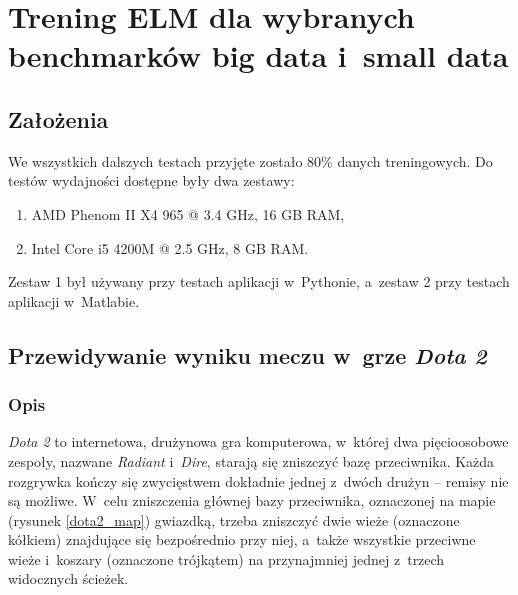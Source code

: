 \documentclass[pl]{minipw} %
\begin{document}
\chapter{Trening ELM dla wybranych benchmarków big data i~small data}
\section{Założenia}
We wszystkich dalszych testach przyjęte zostało 80\% danych treningowych. Do testów wydajności dostępne były dwa zestawy:
\begin{enumerate}
\item AMD Phenom II X4 965 @ 3.4 GHz, 16 GB RAM,
\item Intel Core i5 4200M @ 2.5 GHz, 8 GB RAM.
\end{enumerate}
Zestaw 1 był używany przy testach aplikacji w~Pythonie, a~zestaw 2 przy testach aplikacji w~Matlabie.
\section{Przewidywanie wyniku meczu w~grze \textit{Dota 2}}
\subsection{Opis}
\textit{Dota 2} to internetowa, drużynowa gra komputerowa, w~której dwa pięcioosobowe zespoły, nazwane \textit{Radiant} i~\textit{Dire}, starają się zniszczyć bazę przeciwnika. Każda rozgrywka kończy się zwycięstwem dokładnie jednej z~dwóch drużyn -- remisy nie są możliwe. W~celu zniszczenia głównej bazy przeciwnika, oznaczonej na mapie (rysunek \ref{dota2_map}) gwiazdką, trzeba zniszczyć dwie wieże (oznaczone kółkiem) znajdujące się bezpośrednio przy niej, a~także wszystkie przeciwne wieże i~koszary (oznaczone trójkątem) na przynajmniej jednej z~trzech widocznych ścieżek.
\end{document}
